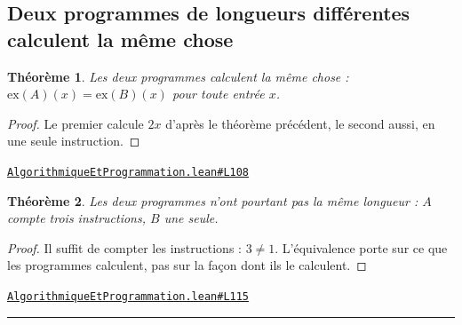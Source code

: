 \documentclass[11pt,a4paper]{article}
\theoremstyle{definition}
\theoremstyle{plain}
\newtheorem{theoreme}{Théorème}
\newcommand{\source}[2]{\par\smallskip\noindent\hfill{\footnotesize\href{#1}{\texttt{#2}}}\par\smallskip}
\begin{document}
\subsection{Deux programmes de longueurs différentes calculent la même chose}

\begin{theoreme}
Les deux programmes calculent la même chose :
$\mathrm{ex}(A)(x) = \mathrm{ex}(B)(x)$ pour toute entrée $x$.
\end{theoreme}

\begin{proof}
Le premier calcule $2x$ d'après le théorème précédent, le second aussi, en une seule
instruction.
\end{proof}
\source{https://github.com/Commutator-IO/learn-lean/blob/main/cours/01-college/07-algorithmique-et-programmation/AlgorithmiqueEtProgrammation.lean\#L108}{AlgorithmiqueEtProgrammation.lean\#L108}

\begin{theoreme}
Les deux programmes n'ont pourtant pas la même longueur : $A$ compte trois
instructions, $B$ une seule.
\end{theoreme}

\begin{proof}
Il suffit de compter les instructions : $3 \ne 1$. L'équivalence porte sur ce que les
programmes calculent, pas sur la façon dont ils le calculent.
\end{proof}
\source{https://github.com/Commutator-IO/learn-lean/blob/main/cours/01-college/07-algorithmique-et-programmation/AlgorithmiqueEtProgrammation.lean\#L115}{AlgorithmiqueEtProgrammation.lean\#L115}

\vfill
\noindent\rule{0.35\linewidth}{0.4pt}\par
{}
\end{document}
